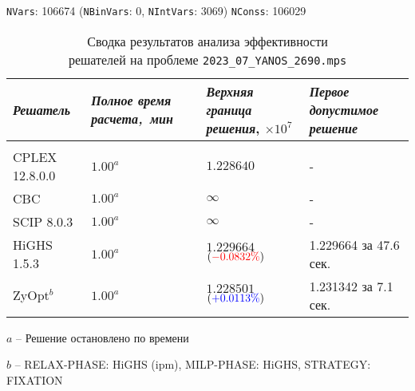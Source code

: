 \documentclass[%
	11pt,
	a4paper,
	utf8,
		]{article}
\begin{document}
{
	\begin{table}[!h]
		\centering
		\caption{Сводка результатов анализа эффективности \\решателей на проблеме \texttt{2023\_07\_YANOS\_2690.mps}}
		
		{\footnotesize \texttt{NVars}: 106674 (\texttt{NBinVars}: 0,  \texttt{NIntVars}: 3069) \texttt{NConss}: 106029}\\[2mm]
		
		\begin{tabular}{ p{2.7cm} p{2.5cm} p{3.6cm} p{3.7cm}}
			\emph{Решатель} & \emph{Полное время \mbox{расчета, мин}} & \emph{Верхняя граница} \mbox{\itshape решения}, $ \times 10^{7} $ & \emph{Первое допустимое решение} \\
			\hline\hline\\[-3.5mm]
			{CPLEX 12.8.0.0} & $ 1.00^a $ & $ 1.228640 $ & - \\
			\hline
			{CBC} & $ 1.00^a $ & $ \infty $ & - \\
			\hline
			{SCIP 8.0.3} & $ 1.00^a $ & $ \infty $ & -  \\
			\hline
			{HiGHS 1.5.3} & $ 1.00^a $ & $ 1.229664 $ $ ({\color{red} \fpeval{trunc(\cplexHighsObjRel, 4)}\%}) $ & 1.229664 за 47.6 сек. \\
			\hline
			ZyOpt$^b$ & $ 1.00^a $  & $ 1.228501 $ $ ({\color{blue} +\fpeval{trunc(\cplexZyoptObjRel, 4)}\%}) $ & 1.231342 за 7.1 сек. \\
		\end{tabular}
	\end{table}
\vspace*{-3mm}
\hspace*{5mm}$ a $ -- {\footnotesize Решение остановлено по времени}

\hspace*{5mm}$ b $ -- {\footnotesize RELAX-PHASE: HiGHS (ipm), MILP-PHASE: HiGHS, STRATEGY: FIXATION}
}
\end{document}
